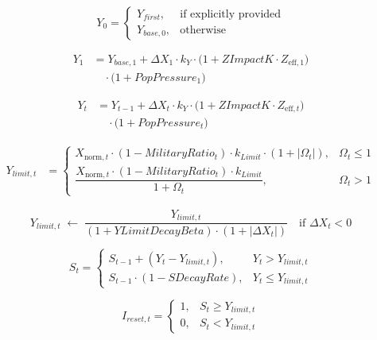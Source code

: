 \documentclass{article}
\begin{document}
\begin{equation}
Y_0 =
\begin{cases}
Y_{first}, & \text{if explicitly provided} \\
Y_{base,0}, & \text{otherwise}
\end{cases}
\end{equation}

\begin{equation}
\begin{aligned}
Y_1 &= Y_{base,1} + \Delta X_1 \cdot k_Y \cdot \big( 1 + ZImpactK \cdot Z_{\mathrm{eff},1} \big) \\
&\quad \cdot \big( 1 + PopPressure_1 \big)
\end{aligned}
\end{equation}

\begin{equation}
\begin{aligned}
Y_t &= Y_{t-1} + \Delta X_t \cdot k_Y \cdot \big( 1 + ZImpactK \cdot Z_{\mathrm{eff},t} \big) \\
&\quad \cdot \big( 1 + PopPressure_t \big)
\end{aligned}
\end{equation}

\begin{equation}
\begin{aligned}
Y_{limit,t} &=
\begin{cases}
X_{\mathrm{norm},t} \cdot (1 - MilitaryRatio_t) \cdot k_{Limit} \cdot (1 + |\Omega_t|), & \Omega_t \leq 1 \\
\dfrac{X_{\mathrm{norm},t} \cdot (1 - MilitaryRatio_t) \cdot k_{Limit}}{1 + \Omega_t}, & \Omega_t > 1
\end{cases}
\end{aligned}
\end{equation}

\begin{equation}
Y_{limit,t} \;\gets\; \frac{Y_{limit,t}}{ (1 + YLimitDecayBeta) \cdot (1 + |\Delta X_t|) } 
\quad \text{if } \Delta X_t < 0
\end{equation}

\begin{equation}
S_t =
\begin{cases}
S_{t-1} + (Y_t - Y_{limit,t}), & Y_t > Y_{limit,t} \\
S_{t-1} \cdot (1 - SDecayRate), & Y_t \leq Y_{limit,t}
\end{cases}
\end{equation}

\begin{equation}
I_{reset,t} =
\begin{cases}
1, & S_t \geq Y_{limit,t} \\
0, & S_t < Y_{limit,t}
\end{cases}
\end{equation}
\end{document}
